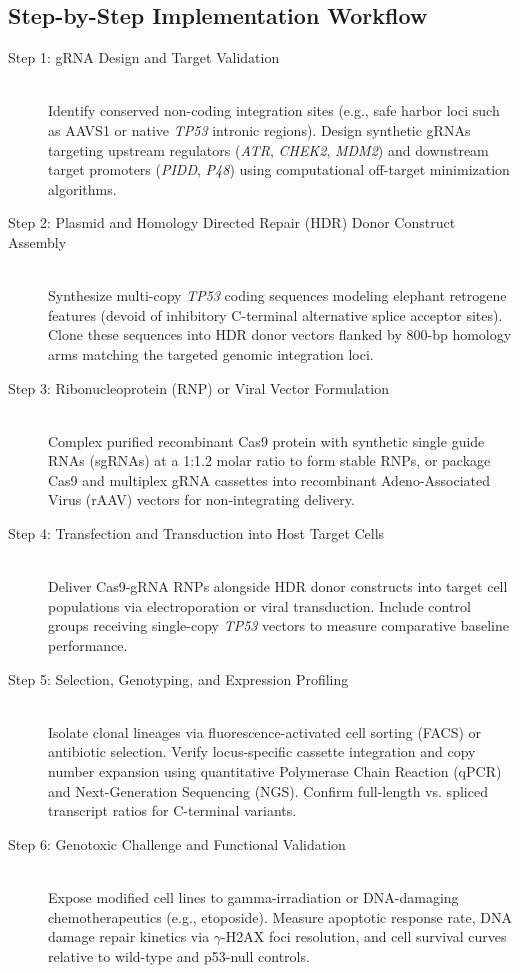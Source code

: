 \documentclass[11pt,a4paper]{article}
\begin{document}
\subsection{Step-by-Step Implementation Workflow}

\begin{description}
    \item[Step 1: gRNA Design and Target Validation] \hfill \\
    Identify conserved non-coding integration sites (e.g., safe harbor loci such as AAVS1 or native \textit{TP53} intronic regions). Design synthetic gRNAs targeting upstream regulators (\textit{ATR}, \textit{CHEK2}, \textit{MDM2}) and downstream target promoters (\textit{PIDD}, \textit{P48}) using computational off-target minimization algorithms.
    
    \item[Step 2: Plasmid and Homology Directed Repair (HDR) Donor Construct Assembly] \hfill \\
    Synthesize multi-copy \textit{TP53} coding sequences modeling elephant retrogene features (devoid of inhibitory C-terminal alternative splice acceptor sites). Clone these sequences into HDR donor vectors flanked by 800-bp homology arms matching the targeted genomic integration loci.
    
    \item[Step 3: Ribonucleoprotein (RNP) or Viral Vector Formulation] \hfill \\
    Complex purified recombinant Cas9 protein with synthetic single guide RNAs (sgRNAs) at a 1:1.2 molar ratio to form stable RNPs, or package Cas9 and multiplex gRNA cassettes into recombinant Adeno-Associated Virus (rAAV) vectors for non-integrating delivery.
    
    \item[Step 4: Transfection and Transduction into Host Target Cells] \hfill \\
    Deliver Cas9-gRNA RNPs alongside HDR donor constructs into target cell populations via electroporation or viral transduction. Include control groups receiving single-copy \textit{TP53} vectors to measure comparative baseline performance.
    
    \item[Step 5: Selection, Genotyping, and Expression Profiling] \hfill \\
    Isolate clonal lineages via fluorescence-activated cell sorting (FACS) or antibiotic selection. Verify locus-specific cassette integration and copy number expansion using quantitative Polymerase Chain Reaction (qPCR) and Next-Generation Sequencing (NGS). Confirm full-length vs. spliced transcript ratios for C-terminal variants.
    
    \item[Step 6: Genotoxic Challenge and Functional Validation] \hfill \\
    Expose modified cell lines to gamma-irradiation or DNA-damaging chemotherapeutics (e.g., etoposide). Measure apoptotic response rate, DNA damage repair kinetics via $\gamma$-H2AX foci resolution, and cell survival curves relative to wild-type and p53-null controls.
\end{description}
\end{document}
